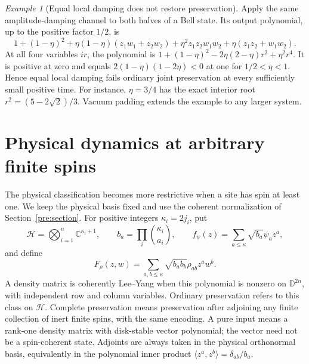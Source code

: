 \documentclass[reqno]{amsart}
\theoremstyle{definition}
\theoremstyle{remark}
\newtheorem{example}[theorem]{Example}
\newcommand{\C}{\mathbb C}
\newcommand{\D}{\mathbb D}
\begin{document}
\begin{example}[Equal local damping does not restore preservation]\label{dyn:equal-damping}
Apply the same amplitude-damping channel to both halves of a Bell state.
Its output polynomial, up to the positive factor $1/2$, is
\[
 1+(1-\eta)^2+\eta(1-\eta)(z_1w_1+z_2w_2)
 +\eta^2z_1z_2w_1w_2+\eta(z_1z_2+w_1w_2).
\]
At all four variables $ir$, the polynomial is
$1+(1-\eta)^2-2\eta(2-\eta)r^2+\eta^2r^4$.
It is positive at zero and equals $2(1-\eta)(1-2\eta)<0$ at one for
$1/2<\eta<1$.  Hence equal local damping fails ordinary joint
preservation at every sufficiently small positive time.  For instance,
$\eta=3/4$ has the exact interior root
$r^2=(5-2\sqrt2)/3$.  Vacuum padding extends the example to any larger
system.
\end{example}


\section{Physical dynamics at arbitrary finite spins}
\label{dynspin:subsection}

The physical classification becomes more restrictive when a site has spin
at least one.  We keep the physical basis fixed and use the coherent
normalization of Section~\ref{pre:section}.  For positive integers
$\kappa_i=2j_i$, put
\[
 \mathcal H=\bigotimes_{i=1}^n\C^{\kappa_i+1},\qquad
 b_a=\prod_i\binom{\kappa_i}{a_i},\qquad
 f_\psi(z)=\sum_{a\leq\kappa}\sqrt{b_a}\psi_a z^a,
\]
and define
\begin{equation}\label{dynspin:kernel}
 F_\rho(z,w)=\sum_{a,b\leq\kappa}\sqrt{b_ab_b}\rho_{ab}z^aw^b.
\end{equation}
A density matrix is coherently Lee--Yang when this polynomial is nonzero
on $\D^{2n}$, with independent row and column variables.  Ordinary
preservation refers to this class on $\mathcal H$.  Complete preservation
means preservation after adjoining any finite collection of inert finite
spins, with the same encoding.  A pure input means a rank-one density
matrix with disk-stable vector polynomial; the vector need not be a
spin-coherent state.  Adjoints are always taken in the physical
orthonormal basis, equivalently in the polynomial inner product
$\langle z^a,z^b\rangle=\delta_{ab}/b_a$.
\end{document}

